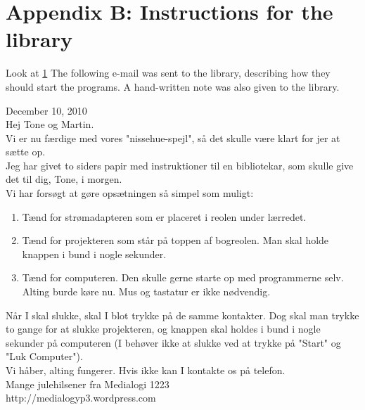 \section{Appendix B: Instructions for the library}\label{email}
Look at \ref{email}
The following e-mail was sent to the library, describing how they should start the programs. A hand-written note was also given to the library.

\begin{fancyquotes}
December 10, 2010\\
Hej Tone og Martin.\\

Vi er nu f{\ae}rdige med vores "nissehue-spejl", s{\aa} det skulle v{\ae}re klart for jer at s{\ae}tte op.\\

Jeg har givet to siders papir med instruktioner til en bibliotekar, som skulle give det til dig, Tone, i morgen.\\

Vi har fors{\o}gt at g{\o}re ops{\ae}tningen s{\aa} simpel som muligt:\\

\begin{enumerate}
\item T{\ae}nd for str{\o}madapteren som er placeret i reolen under l{\ae}rredet.
\item T{\ae}nd for projekteren som st{\aa}r p{\aa} toppen af bogreolen. Man skal holde knappen i bund i nogle sekunder.
\item T{\ae}nd for computeren. Den skulle gerne starte op med programmerne selv. Alting burde k{\o}re nu. Mus og tastatur er ikke n{\o}dvendig.
\end{enumerate}

N{\aa}r I skal slukke, skal I blot trykke p{\aa} de samme kontakter. Dog skal man trykke to gange for at slukke projekteren, og knappen skal holdes i bund i nogle sekunder p{\aa} computeren (I beh{\o}ver ikke at slukke ved at trykke p{\aa} "Start" og "Luk Computer").\\

Vi h{\aa}ber, alting fungerer. Hvis ikke kan I kontakte os p{\aa} telefon.\\

Mange julehilsener fra Medialogi 1223\\
http://medialogyp3.wordpress.com\end{fancyquotes}
